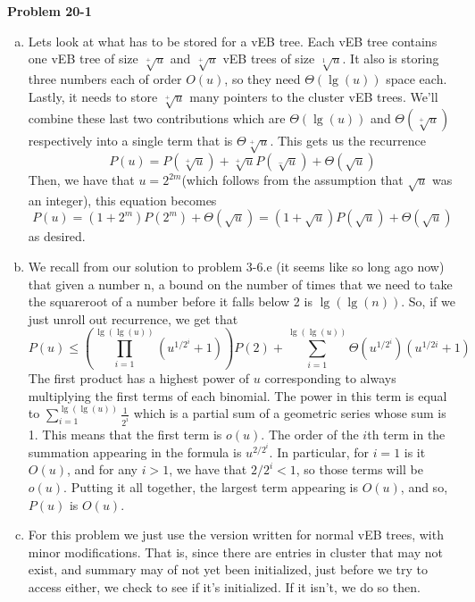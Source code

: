 \documentclass{article}
\begin{document}
\noindent\textbf{Problem 20-1}\\

\begin{enumerate}[a.]
\item
Lets look at what has to be stored for a vEB tree. Each vEB tree contains one vEB tree of size $\sqrt[+]{u}$ and $\sqrt[+]{u}$ vEB trees of size $\sqrt[1]{u}$. It also is storing three numbers each of order $O(u)$, so they need $\Theta(\lg(u))$ space each. Lastly, it needs to store $\sqrt[+]{u}$ many pointers to the cluster vEB trees. We'll combine these last two contributions which are $\Theta(\lg(u))$ and $\Theta(\sqrt[+]{u})$ respectively into a single term that is $\Theta\sqrt[+]{u}$. This gets us the recurrence
\[
P(u) = P(\sqrt[+]{u}) + \sqrt[+]{u}P(\sqrt[-]{u}) + \Theta(\sqrt{u})
\]
Then, we have that $u=2^{2m}$(which follows from the assumption that $\sqrt{u}$ was an integer), this equation becomes
\[
P(u) = (1+2^m)P(2^m) + \Theta(\sqrt{u}) = (1+ \sqrt{u})P(\sqrt{u})+\Theta(\sqrt{u})
\]
as desired.
\item
We recall from our solution to problem 3-6.e (it seems like so long ago now) that given a number n, a bound on the number of times that we need to take the squareroot of a number before it falls below 2 is $\lg(\lg(n))$. So, if we just unroll out recurrence, we get that
\[
P(u) \le \left(\prod_{i=1}^{\lg(\lg(u))}(u^{1/2^i}+1)\right) P(2) + \sum_{i=1}^{\lg(\lg(u))} \Theta(u^{1/2^i})(u^{1/2i}+1)
\]
The first product has a highest power of $u$ corresponding to always multiplying the first terms of each binomial. The power in this term is equal to $\sum_{i=1}^{\lg(\lg(u))} \frac{1}{2^i}$ which is a partial sum of a geometric series whose sum is 1. This means that the first term is $o(u)$. The order of the $i$th term in the summation appearing in the formula is $u^{2/2^i}$. In particular, for $i=1$ is it $O(u)$, and for any $i>1$, we have that $2/2^i <1$, so those terms will be $o(u)$. Putting it all together, the largest term appearing is $O(u)$, and so, $P(u)$ is $O(u)$.
\item
For this problem we just use the version written for normal vEB trees, with minor modifications. That is, since there are entries in cluster that may not exist, and summary may of not yet been initialized, just before we try to access either, we check to see if it's initialized. If it isn't, we do so then.


\end{enumerate}
\end{document}
